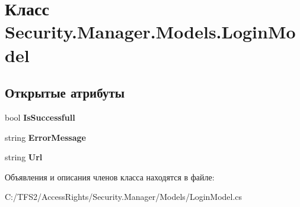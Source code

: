 \hypertarget{class_security_1_1_manager_1_1_models_1_1_login_model}{}\section{Класс Security.\+Manager.\+Models.\+Login\+Model}
\label{class_security_1_1_manager_1_1_models_1_1_login_model}
\subsection*{Открытые атрибуты}
\begin{DoxyCompactItemize}
\item 
\mbox{\label{class_security_1_1_manager_1_1_models_1_1_login_model_acc234fe62ef7f74ba240159817ae9962}} 
bool {\bfseries Is\+Successfull}
\item 
\mbox{\label{class_security_1_1_manager_1_1_models_1_1_login_model_a8903ae09cd6537fad0d52e1a77fe91c1}} 
string {\bfseries Error\+Message}
\item 
\mbox{\label{class_security_1_1_manager_1_1_models_1_1_login_model_a57463c953a4ab908ada8d0782344071e}} 
string {\bfseries Url}
\end{DoxyCompactItemize}


Объявления и описания членов класса находятся в файле\+:\begin{DoxyCompactItemize}
\item 
C\+:/\+T\+F\+S2/\+Access\+Rights/\+Security.\+Manager/\+Models/Login\+Model.\+cs\end{DoxyCompactItemize}
